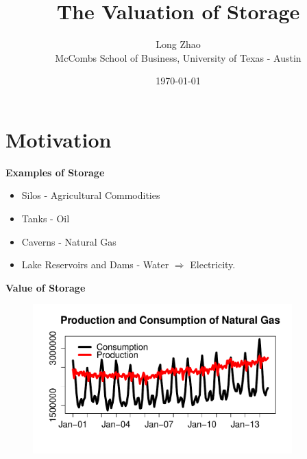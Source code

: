 \documentclass{beamer}
\title[Short title]{The Valuation of Storage} %
\author{Long Zhao\\ {\footnotesize McCombs School of Business, University of Texas - Austin}} %
\institute[UT Austin] %
{
 \small{Joint work with Kumar Muthuraman and Stathis Tompaidis}\\ %
\medskip
}
\date{\today} %
\begin{document}
\begin{frame}
\titlepage %
\end{frame}

\section{Motivation}

\begin{frame}
{\bf Examples of Storage}
\begin{itemize}
  \item Silos - Agricultural Commodities
  \item Tanks - Oil
  \item Caverns - Natural Gas 
  \item Lake Reservoirs and Dams - Water $\Rightarrow$ Electricity.          
  \end{itemize}
\end{frame}


\begin{frame}
{\bf Value of Storage}
\begin{figure}[hbt]
  \includegraphics[width = 10cm]{DemandSupply.pdf}
\end{figure}


\end{frame}
\end{document}
